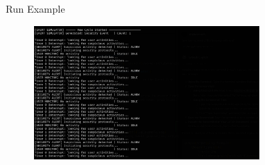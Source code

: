 \begin{frame}{Run Example}
    \begin{figure}[h]
        \centering
        \includegraphics[width=0.75\textwidth]{images/run_example.png}
    \end{figure}
\end{frame}
